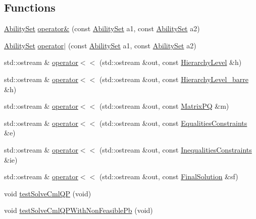 \subsection*{Functions}
\begin{DoxyCompactItemize}
\item 
\hyperlink{classocra_1_1AbilitySet}{Ability\+Set} \hyperlink{namespaceocra_ac476e74d326d1906d6e2a71001efa929}{operator\&} (const \hyperlink{classocra_1_1AbilitySet}{Ability\+Set} a1, const \hyperlink{classocra_1_1AbilitySet}{Ability\+Set} a2)
\item 
\hyperlink{classocra_1_1AbilitySet}{Ability\+Set} \hyperlink{namespaceocra_ade6062205230e055930cc06015904895}{operator$\vert$} (const \hyperlink{classocra_1_1AbilitySet}{Ability\+Set} a1, const \hyperlink{classocra_1_1AbilitySet}{Ability\+Set} a2)
\item 
std\+::ostream \& \hyperlink{namespaceocra_a1a3b81827cc00a5d60d7b291760a2c24}{operator$<$$<$} (std\+::ostream \&out, const \hyperlink{structocra_1_1HierarchyLevel}{Hierarchy\+Level} \&h)
\item 
std\+::ostream \& \hyperlink{namespaceocra_a32e98e3aa2f08382b40856002969589e}{operator$<$$<$} (std\+::ostream \&out, const \hyperlink{structocra_1_1HierarchyLevel__barre}{Hierarchy\+Level\+\_\+barre} \&h)
\item 
std\+::ostream \& \hyperlink{namespaceocra_a8e1107e277e275155b0762fd2ab2fc98}{operator$<$$<$} (std\+::ostream \&out, const \hyperlink{structocra_1_1MatrixPQ}{Matrix\+PQ} \&m)
\item 
std\+::ostream \& \hyperlink{namespaceocra_ace0d689942bcbdba20f3b51269fe5b01}{operator$<$$<$} (std\+::ostream \&out, const \hyperlink{structocra_1_1EqualitiesConstraints}{Equalities\+Constraints} \&e)
\item 
std\+::ostream \& \hyperlink{namespaceocra_ab9f8bd4031efb0e66f55ecd7ddda5801}{operator$<$$<$} (std\+::ostream \&out, const \hyperlink{structocra_1_1InequalitiesConstraints}{Inequalities\+Constraints} \&ie)
\item 
std\+::ostream \& \hyperlink{namespaceocra_a26b4974314516fab1d057c935783e24b}{operator$<$$<$} (std\+::ostream \&out, const \hyperlink{structocra_1_1FinalSolution}{Final\+Solution} \&sf)
\item 
void \hyperlink{namespaceocra_a1622744f4ef36df9f5b67eab7c19078a}{test\+Solve\+Cml\+QP} (void)
\item 
void \hyperlink{namespaceocra_ac7bf5fa708df93404630542f6d1f0b34}{test\+Solve\+Cml\+Q\+P\+With\+Non\+Feasible\+Pb} (void)
\item 

\end{DoxyCompactItemize}
